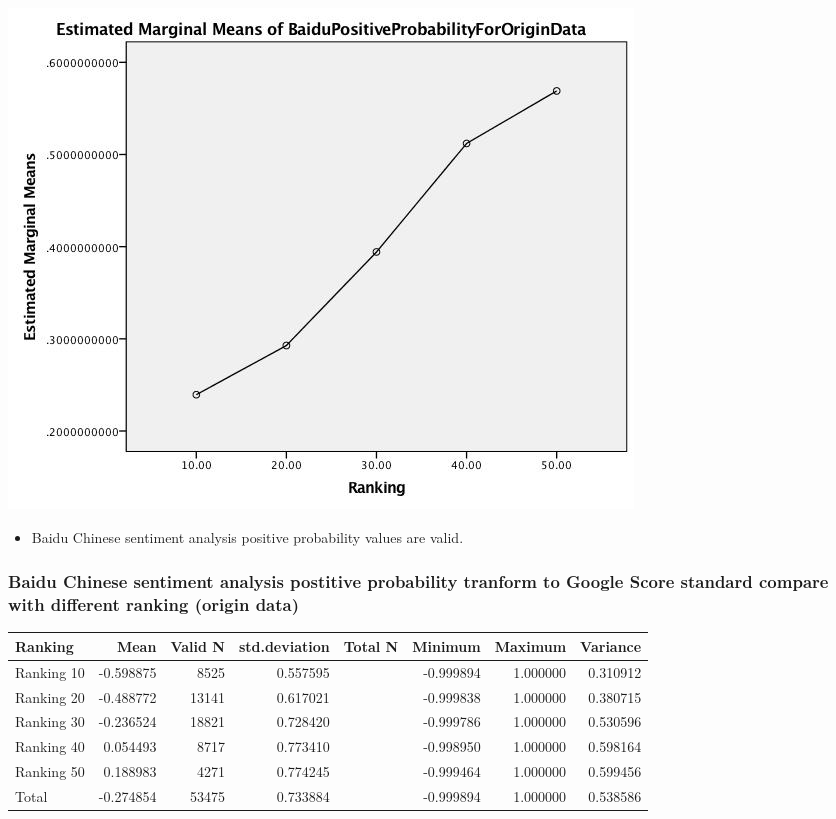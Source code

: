 \begin{center}
\includegraphics[width=.9\linewidth]{./img/MarginalMeansOfBaiduPositiveProbabilityForOriginData.jpg}
\end{center}

\begin{itemize}
\item Baidu Chinese sentiment analysis positive probability values are valid.
\end{itemize}

\subsubsection{Baidu Chinese sentiment analysis postitive probability tranform to Google Score standard compare with different ranking (origin data)}
\label{sec:org738019a}
\begin{center}
\begin{tabular}{lrrrlrrr}
Ranking & Mean & Valid N & std.deviation & Total N & Minimum & Maximum & Variance\\
\hline
Ranking 10 & -0.598875 & 8525 & 0.557595 &  & -0.999894 & 1.000000 & 0.310912\\
Ranking 20 & -0.488772 & 13141 & 0.617021 &  & -0.999838 & 1.000000 & 0.380715\\
Ranking 30 & -0.236524 & 18821 & 0.728420 &  & -0.999786 & 1.000000 & 0.530596\\
Ranking 40 & 0.054493 & 8717 & 0.773410 &  & -0.998950 & 1.000000 & 0.598164\\
Ranking 50 & 0.188983 & 4271 & 0.774245 &  & -0.999464 & 1.000000 & 0.599456\\
Total & -0.274854 & 53475 & 0.733884 &  & -0.999894 & 1.000000 & 0.538586\\
\end{tabular}
\end{center}

